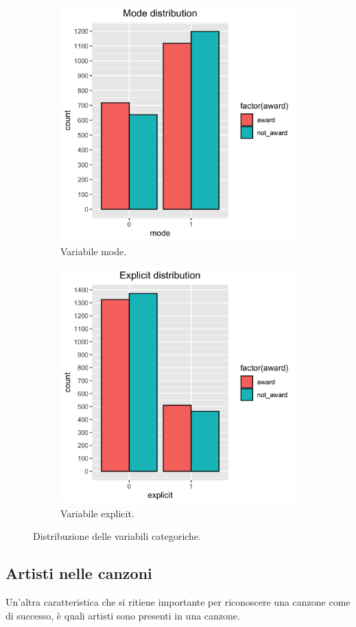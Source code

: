 \begin{figure}[!h]
	\begin{subfigure}[b]{0.3\textwidth}
		\centering
		\hspace*{-2cm}   
		\includegraphics[width=10cm]{../images/mode_distribution.png}
		\caption{Variabile mode.}
	\end{subfigure}
	\hfill
	\begin{subfigure}[b]{0.6\textwidth}
		\centering
		\includegraphics[width=10cm]{../images/explicit_distribution.png}
		\caption{Variabile explicit.}
	\end{subfigure}%
	\caption{Distribuzione delle variabili categoriche.}
\end{figure}

\subsection{Artisti nelle canzoni}
Un'altra caratteristica che si ritiene importante per riconoscere una
canzone come di successo, è quali artisti sono presenti in una
canzone.

